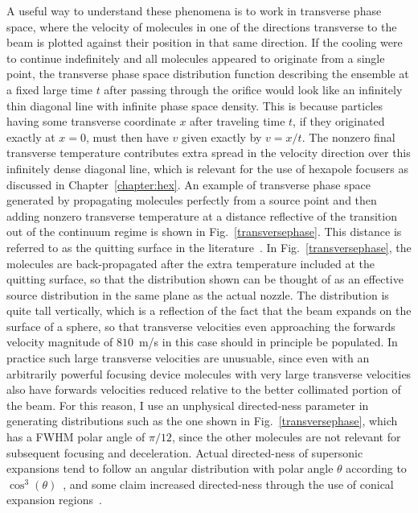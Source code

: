 A useful way to understand these phenomena is to work in transverse phase space, where the velocity of molecules in one of the directions transverse to the beam is plotted against their position in that same direction.
If the cooling were to continue indefinitely and all molecules appeared to originate from a single point, the transverse phase space distribution function describing the ensemble at a fixed large time $t$ after passing through the orifice would look like an infinitely thin diagonal line with infinite phase space density. 
This is because particles having some transverse coordinate $x$ after traveling time $t$, if they originated exactly at $x=0$, must then have $v$ given exactly by $v = x/t$.
The nonzero final transverse temperature contributes extra spread in the velocity direction over this infinitely dense diagonal line, which is relevant for the use of hexapole focusers as discussed in Chapter~\ref{chapter:hex}.
An example of transverse phase space generated by propagating molecules perfectly from a source point and then adding nonzero transverse temperature at a distance reflective of the transition out of the continuum regime is shown in Fig.~\ref{transversephase}.
This distance is referred to as the quitting surface in the literature~\cite{Miller1988}.
In Fig.~\ref{transversephase}, the molecules are back-propagated after the extra temperature included at the quitting surface, so that the distribution shown can be thought of as an effective source distribution in the same plane as the actual nozzle.
The distribution is quite tall vertically, which is a reflection of the fact that the beam expands on the surface of a sphere, so that transverse velocities even approaching the forwards velocity magnitude of $810$~m/s in this case should in principle be populated.
In practice such large transverse velocities are unusuable, since even with an arbitrarily powerful focusing device molecules with very large transverse velocities also have forwards velocities reduced relative to the better collimated portion of the beam.
For this reason, I use an unphysical directed-ness parameter in generating distributions such as the one shown in Fig.~\ref{transversephase}, which has a FWHM polar angle of $\pi/12$, since the other molecules are not relevant for subsequent focusing and deceleration.
Actual directed-ness of supersonic expansions tend to follow an angular distribution with polar angle $\theta$ according to $\cos^3(\theta)$~\cite{Miller1988}, and some claim increased directed-ness through the use of conical expansion regions~\cite[Fig.~11]{Even2015}.


